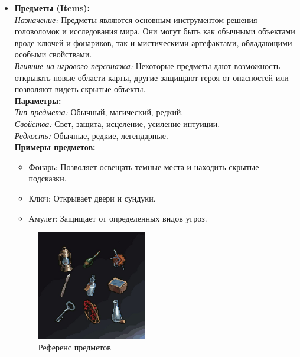 \documentclass{article}
\begin{document}
	\begin{itemize}
		\item \textbf{Предметы (Items):}  \\
		\textit{Назначение:} Предметы являются основным инструментом решения головоломок и исследования мира. Они могут быть как обычными объектами вроде ключей и фонариков, так и мистическими артефактами, обладающими особыми свойствами.  \\
		\textit{Влияние на игрового персонажа:} Некоторые предметы дают возможность открывать новые области карты, другие защищают героя от опасностей или позволяют видеть скрытые объекты.  \\
		\textbf{Параметры:}  \\
		\textit{Тип предмета:} Обычный, магический, редкий.  \\
		\textit{Свойства:} Свет, защита, исцеление, усиление интуиции.  \\
		\textit{Редкость:} Обычные, редкие, легендарные.  \\
		\textbf{Примеры предметов:}
		\begin{itemize}
			\item Фонарь: Позволяет освещать темные места и находить скрытые подсказки.
			\item Ключ: Открывает двери и сундуки.
			\item Амулет: Защищает от определенных видов угроз.
		\end{itemize}
		\begin{figure}[h]
			\centering
			\includegraphics[width=0.45\textwidth]{images/items1.jpg}
			\caption{Референс предметов}
			\label{fig:items}
		\end{figure}
		\newpage
		

\end{itemize}
\end{document}
